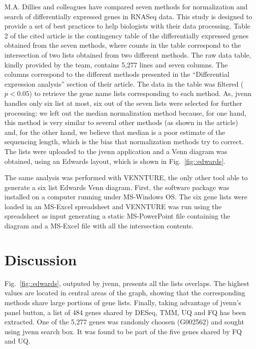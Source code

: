 \documentclass{bmcart}
\begin{document}
M.A. Dillies and colleagues \cite{Dillies2012} have compared seven methods for
normalization and search of differentially expressed genes in RNASeq data. This
study is designed to provide a set of best practices to help biologists with
their data processing. Table 2 of the cited article is the contingency table
of the differentially expressed genes obtained from the seven methods, where 
counts in the table correspond to the intersection of two lists obtained from
two different methods. The raw data table, kindly provided by the team, contains
5,277 lines and seven columns. The columns correspond to the different methods
presented in the ``Differential expression analysis'' section of their article.
The data in the table was filtered ($p < 0.05$) to retrieve the gene name lists
corresponding to each method. As, jvenn handles only six list at most, six out
of the seven lists were selected for further processing: we left out the median
normalization method because, for one hand, this method is very similar to
several other methods (as shown in the article) and, for the other hand, we
believe that median is a poor estimate of the sequencing length, which is the
bias that normalization methods try to correct. The lists were uploaded to the
jvenn application and a Venn diagram was obtained, using an Edwards layout,
which is shown in Fig.~\ref{fig::edwards}.

The same analysis was performed with VENNTURE, the only other tool able to
generate a six list Edwards Venn diagram. First, the software package was
installed on a computer running under MS-Windows OS. The six gene lists were 
loaded in an MS-Excel spreadsheet and VENNTURE was run using the spreadsheet as
input generating a static MS-PowerPoint file containing the diagram and a MS-Excel
file with all the intersection contents.

\section*{Discussion}

Fig.~\ref{fig::edwards}, outputed by jvenn, presents all the lists overlaps. The
highest values are located in central areas of the graph, showing that the corresponding methods
share large portions of gene lists. Finally, taking advantage of jvenn's panel
button, a list of 484 genes shared by DESeq, TMM, UQ and FQ has been extracted.
One of the 5,277 genes was randomly choosen (G002562) and sought using jvenn
search box. It was found to be part of the five genes shared by FQ and UQ.
\end{document}
